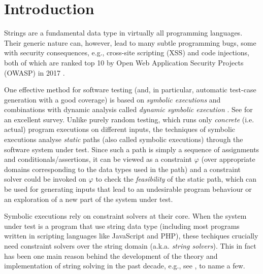 \section{Introduction}
\label{sec:intro}

Strings are a fundamental data type in virtually all programming languages.
Their generic nature can, however, lead to many subtle programming 
bugs, some with security consequences, e.g., cross-site scripting
(XSS) and code injections, both of which are ranked top 10 by Open Web
Application Security Projects (OWASP) in 2017 \cite{owasp17}. 

One effective
method for software testing (and, in particular, automatic test-case 
generation with a good coverage) is based on \emph{symbolic executions} 
\cite{king76} and combinations with dynamic analysis
called \emph{dynamic symbolic execution} \cite{jalangi,DART,EXE,CUTE,KLEE}.
See \cite{symbex-survey} for an excellent survey. Unlike purely random testing,
which runs only \emph{concrete} (i.e. actual) program executions on different 
inputs, the techniques of symbolic executions analyse \emph{static} paths
(also called symbolic executions) through the software system under test.
Since such a path is simply a sequence of assignments and
conditionals/assertions, it can be viewed as a constraint $\varphi$ (over 
appropriate domains corresponding to the data types used in the path) and a 
constraint solver could be invoked on $\varphi$ to check the \emph{feasibility}
of the static path, which can be used for generating inputs that lead to 
an undesirable program behaviour or an exploration of a new part of the
system under test.

Symbolic executions rely on constraint solvers at their core. When the system
under test is a program that use string data type (including most programs 
written in scripting languages like JavaScript and PHP), these techiques 
crucially need constraint solvers over the string domain (a.k.a. \emph{string 
solvers}). This in fact has been one main reason behind the development of
the theory and implementation of string solving in the past decade, e.g., see 
\cite{BTV09,Berkeley-JavaScript,HAMPI,Stranger,Vijay-length,YABI14,Abdulla14,LB16,fang-yu-circuits,Abdulla17,CCHLW18,HJLRV18,S3,TCJ16,Z3-str,cvc4,BCFJKKV08},
to name a few. 

